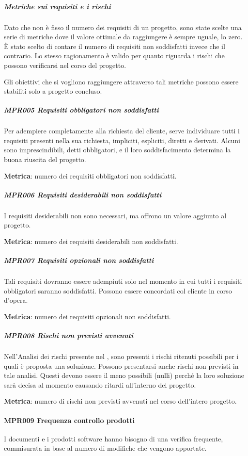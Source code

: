 				\subparagraph*{Metriche sui requisiti e i rischi}
				Dato che non è fisso il numero dei requisiti di un progetto, sono state scelte una serie di metriche dove il valore ottimale da raggiungere è sempre uguale,
				lo zero. È stato scelto di contare il numero di requisiti non soddisfatti invece che il contrario. Lo stesso ragionamento è valido per quanto
				riguarda i rischi che possono verificarsi nel corso del progetto.

				Gli obiettivi che si vogliono raggiungere attraverso tali metriche possono essere stabiliti solo a progetto concluso.

				\subparagraph{MPR005 Requisiti obbligatori non soddisfatti}
				Per adempiere completamente alla richiesta del cliente, serve individuare tutti i requisiti presenti nella sua richiesta, impliciti, espliciti, diretti e derivati. Alcuni sono imprescindibili, detti obbligatori, e il loro soddisfacimento determina la buona riuscita del progetto.

				\textbf{Metrica}: numero dei requisiti obbligatori non soddisfatti.

				\subparagraph{MPR006 Requisiti desiderabili non soddisfatti}
				I requisiti desiderabili non sono necessari, ma offrono un valore aggiunto al progetto.

				\textbf{Metrica}: numero dei requisiti desiderabili non soddisfatti.

				\subparagraph{MPR007 Requisiti opzionali non soddisfatti}
				Tali requisiti dovranno essere adempiuti solo nel momento in cui tutti i requisiti obbligatori saranno soddisfatti.
				Possono essere concordati col cliente in corso d'opera.

				\textbf{Metrica}: numero dei requisiti opzionali non soddisfatti.

				\subparagraph{MPR008 Rischi non previsti avvenuti}
				Nell'Analisi dei rischi presente nel \Doc{\PdPv}, sono presenti i rischi ritenuti possibili per i quali è proposta una soluzione.
				Possono presentarsi anche rischi non previsti in tale analisi. Questi devono essere il meno possibili (nulli) perché la loro soluzione sarà decisa al momento causando ritardi all'interno del progetto.

				\textbf{Metrica}: numero di rischi non previsti avvenuti nel corso dell'intero progetto.

				\paragraph{MPR009 Frequenza controllo prodotti}
				I documenti e i prodotti software hanno bisogno di una verifica frequente, commisurata in base al numero di modifiche che vengono apportate.

